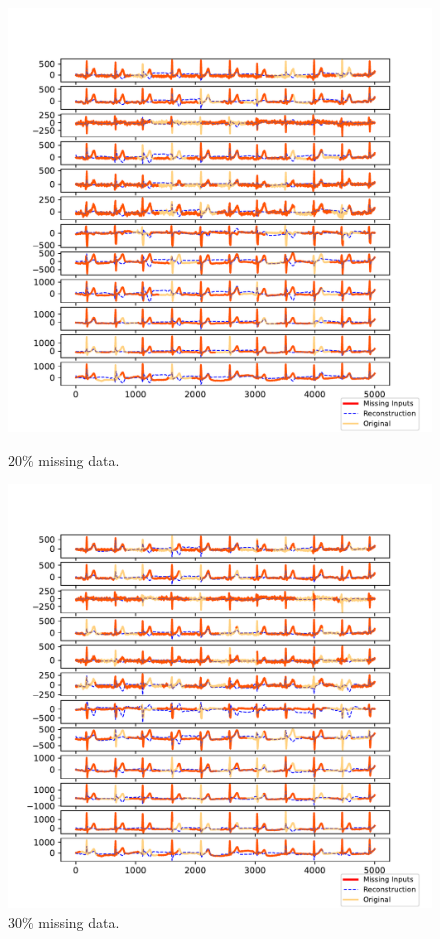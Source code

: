 \documentclass{mldsmsc}
\begin{document}
\begin{figure}[H]
\centering
\begin{minipage}{0.4\linewidth}
    \centering
    \includegraphics[width=\linewidth]{images/missing/tmf_output_20_3.pdf}
    \caption{$20\%$ missing data.}
\end{minipage}%
\hspace{0.05\linewidth}
\begin{minipage}{0.4\linewidth}
    \centering
    \includegraphics[width=\linewidth]{images/missing/tmf_output_30_3.pdf}
    \caption{$30\%$ missing data.}
\end{minipage}


\end{figure}
\end{document}
